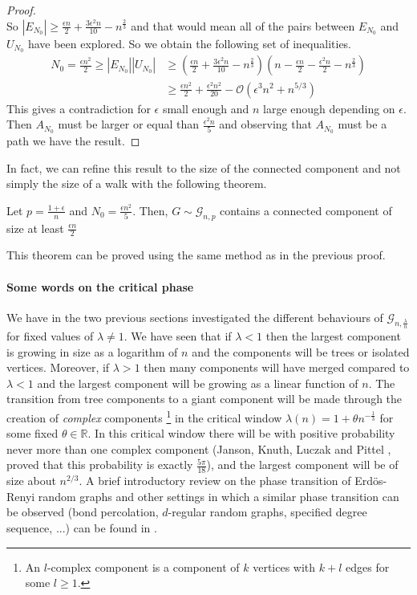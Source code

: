 \begin{proof}
\begin{equation}
	\end{equation}
	So $|E_{N_0}| \geq \frac{\epsilon n}{2} + \frac{3\epsilon^2n}{10} - n^{\frac{2}{3}}$ and that would mean all of the pairs between $E_{N_0}$ and $U_{N_0}$ have been explored.
	So we obtain the following set of inequalities.
	\begin{align}
		N_0 = \frac{\epsilon n^2}{2} \geq |E_{N_0}||U_{N_0}| &\geq (\frac{\epsilon n}{2} + \frac{3\epsilon^2n}{10} - n^{\frac{2}{3}} )
									(n - \frac{\epsilon n}{2} - \frac{\epsilon^2 n}{2} - n^{\frac{2}{3}})\\
									&\geq \frac{\epsilon n^2}{2} + \frac{\epsilon ^2 n^2 }{20} - \mathcal{O}(\epsilon ^3n^2 + n^{5/3}) 			
	\end{align}
	This gives a contradiction for $\epsilon$ small enough and $n$ large enough depending on $\epsilon$.
	Then $A_{N_0}$ must be larger or equal than $\frac{\epsilon ^2n}{5}$ and observing that $A_{N_0}$ must be a path we have the result.
\end{proof}
In fact, we can refine this result to the size of the connected component and not simply the size of a walk with the following theorem.
\begin{theorem}
	Let $p = \frac{1+\epsilon}{n}$ and $N_0 = \frac{\epsilon n^2}{5}$. Then, $G \sim \mathcal{G}_{n,p}$ contains a connected component of size at least $\frac{\epsilon n}{2}$
\end{theorem}
This theorem can be proved using the same method as in the previous proof.
\paragraph{Some words on the critical phase}
We have in the two previous sections investigated the different behaviours of $\mathcal{G}_{n, \frac{\lambda}{n}}$ for fixed values of $\lambda \neq 1$.
We have seen that if $\lambda < 1$ then the largest component is growing in size as a logarithm of $n$ and the components will be trees or isolated vertices.
Moreover, if $\lambda > 1$ then many components will have merged compared to $\lambda <1$ and the largest component will be growing as a linear function of $n$.
The transition from tree components to a giant component will be made through the creation of \emph{complex} components
\footnote{An $l$-complex component is a component of $k$ vertices with $k+l$ edges for some $l \geq 1$.}
in the critical window $\lambda(n) = 1 + \theta n^{-\frac{1}{3}}$ for some fixed $\theta \in \mathbb{R}$.
In this critical window there will be with positive probability never more than one complex component (Janson, Knuth, Luczak and Pittel \cite{JansonKnuth}, proved that this probability is exactly $\frac{5\pi}{18}$), and the largest component will be of size about $n^{2/3}$.
A brief introductory review on the phase transition of Erd\"os-Renyi random graphs and other settings in which a similar phase transition can be observed (bond percolation, $d$-regular random graphs, specified degree sequence, ...) can be found in \cite{Spencer09}.


